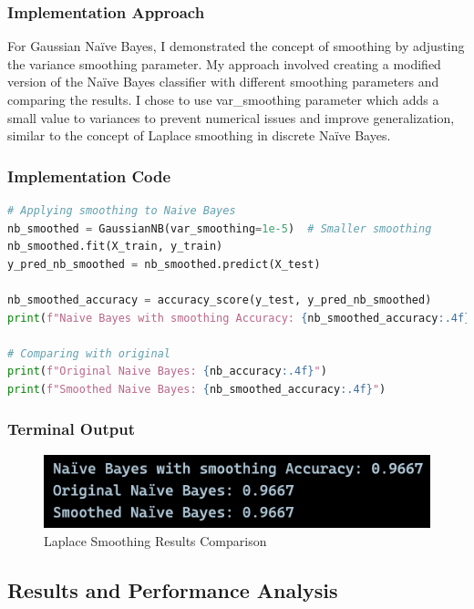 \documentclass[12pt,a4paper]{article}
\begin{document}
\subsubsection{Implementation Approach}
For Gaussian Na\"{i}ve Bayes, I demonstrated the concept of smoothing by adjusting the variance smoothing parameter. My approach involved creating a modified version of the Na\"{i}ve Bayes classifier with different smoothing parameters and comparing the results. I chose to use var\_smoothing parameter which adds a small value to variances to prevent numerical issues and improve generalization, similar to the concept of Laplace smoothing in discrete Na\"{i}ve Bayes.

\subsubsection{Implementation Code}
\begin{lstlisting}[language=Python, caption=Apply Laplace Smoothing]
# Applying smoothing to Naive Bayes
nb_smoothed = GaussianNB(var_smoothing=1e-5)  # Smaller smoothing
nb_smoothed.fit(X_train, y_train)
y_pred_nb_smoothed = nb_smoothed.predict(X_test)

nb_smoothed_accuracy = accuracy_score(y_test, y_pred_nb_smoothed)
print(f"Naive Bayes with smoothing Accuracy: {nb_smoothed_accuracy:.4f}")

# Comparing with original
print(f"Original Naive Bayes: {nb_accuracy:.4f}")
print(f"Smoothed Naive Bayes: {nb_smoothed_accuracy:.4f}")
\end{lstlisting}

\subsubsection{Terminal Output}

\begin{figure}[h!]
    \centering
    \includegraphics[width=\textwidth]{Figures/smoothing.png}
    \caption{Laplace Smoothing Results Comparison}
\end{figure}

\subsection{Results and Performance Analysis}
\end{document}
